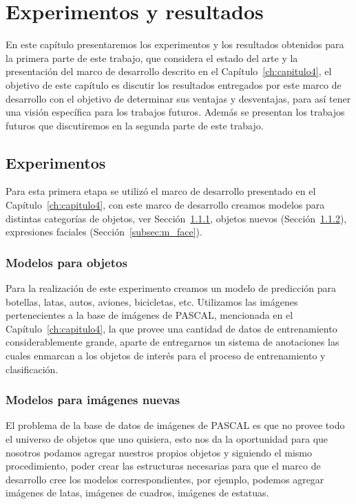 \chapter[Experimentos y resultados]{Experimentos y resultados}\label{ch:capitulo5}
En este capítulo presentaremos los experimentos y los resultados obtenidos para la primera parte de este trabajo, que considera el estado del arte y la presentación del marco de desarrollo descrito en el Capítulo~\ref{ch:capitulo4}, el objetivo de este capítulo es discutir los resultados entregados por este marco de desarrollo con el objetivo de determinar sus ventajas y desventajas, para así tener una visión específica para los trabajos futuros. Además se presentan los trabajos futuros que discutiremos en la segunda parte de este trabajo.

\section{Experimentos}
Para esta primera etapa se utilizó el marco de desarrollo presentado en el Capítulo~\ref{ch:capitulo4}, con este marco de desarrollo creamos modelos para distintas categorías de objetos, ver Sección~\ref{subsec:m_obj}, objetos nuevos (Sección~\ref{subsec:m_new_im}), expresiones faciales (Sección~\ref{subsec:m_face}).

\subsection{Modelos para objetos}\label{subsec:m_obj}
Para la realización de este experimento creamos un modelo de predicción para botellas, latas, autos, aviones, bicicletas, etc. Utilizamos las imágenes pertenecientes a la base de imágenes de PASCAL, mencionada en el Capítulo~\ref{ch:capitulo4}, la que provee una cantidad de datos de entrenamiento considerablemente grande, aparte de entregarnos un sistema de anotaciones las cuales enmarcan a los objetos de interés para el proceso de entrenamiento y clasificación.

\subsection{Modelos para imágenes nuevas}\label{subsec:m_new_im}
El problema de la base de datos de imágenes de PASCAL es que no provee todo el universo de objetos que uno quisiera, esto nos da la oportunidad para que nosotros podamos agregar nuestros propios objetos y siguiendo el mismo procedimiento, poder crear las estructuras necesarias para que el marco de desarrollo cree los modelos correspondientes, por ejemplo, podemos agregar imágenes de latas, imágenes de cuadros, imágenes de estatuas.

